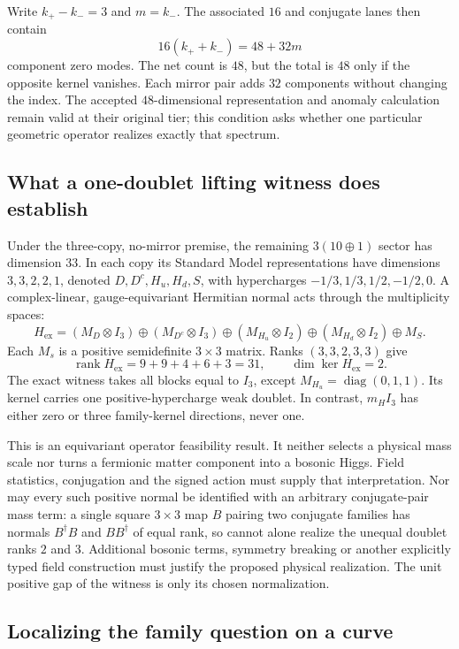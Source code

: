 \documentclass[11pt,a4paper]{article}
\begin{document}
Write \(k_+-k_-=3\) and \(m=k_-\). The associated \(16\) and conjugate
lanes then contain
\[
 16(k_++k_-)=48+32m
\]
component zero modes. The net count is \(48\), but the total is \(48\)
only if the opposite kernel vanishes. Each mirror pair adds \(32\)
components without changing the index. The accepted \(48\)-dimensional
representation and anomaly calculation remain valid at their original
tier; this condition asks whether one particular geometric operator
realizes exactly that spectrum.

\subsection{What a one-doublet lifting witness does establish}
\label{sec:matter-exotic-ranks}

Under the three-copy, no-mirror premise, the remaining
\(3(10\oplus1)\) sector has dimension \(33\). In each copy its Standard
Model representations have dimensions \(3,3,2,2,1\), denoted
\(D,D^c,H_u,H_d,S\), with hypercharges
\(-1/3,1/3,1/2,-1/2,0\). A complex-linear, gauge-equivariant Hermitian
normal acts through the multiplicity spaces:
\[
 H_{\mathrm{ex}}
 = (M_D\otimes I_3)\oplus(M_{D^c}\otimes I_3)
 \oplus(M_{H_u}\otimes I_2)\oplus(M_{H_d}\otimes I_2)\oplus M_S .
\]
Each \(M_s\) is a positive semidefinite \(3\times3\) matrix.
Ranks \((3,3,2,3,3)\) give
\[
 \operatorname{rank}H_{\mathrm{ex}}=9+9+4+6+3=31,\qquad
 \dim\ker H_{\mathrm{ex}}=2.
\]
The exact witness takes all blocks equal to \(I_3\), except
\(M_{H_u}=\operatorname{diag}(0,1,1)\). Its kernel carries one
positive-hypercharge weak doublet. In contrast, \(m_H I_3\) has either
zero or three family-kernel directions, never one.

This is an equivariant operator feasibility result. It neither selects
a physical mass scale nor turns a fermionic matter component into a
bosonic Higgs. Field statistics, conjugation and the signed action must
supply that interpretation. Nor may every such positive normal be
identified with an arbitrary conjugate-pair mass term: a single
square \(3\times3\) map \(B\) pairing two conjugate families has normals
\(B^\dagger B\) and \(BB^\dagger\) of equal rank, so cannot alone realize
the unequal doublet ranks \(2\) and \(3\). Additional bosonic terms,
symmetry breaking or another explicitly typed field construction must
justify the proposed physical realization. The unit positive gap of
the witness is only its chosen normalization.

\subsection{Localizing the family question on a curve}
\label{sec:matter-bht-localization}
\end{document}

